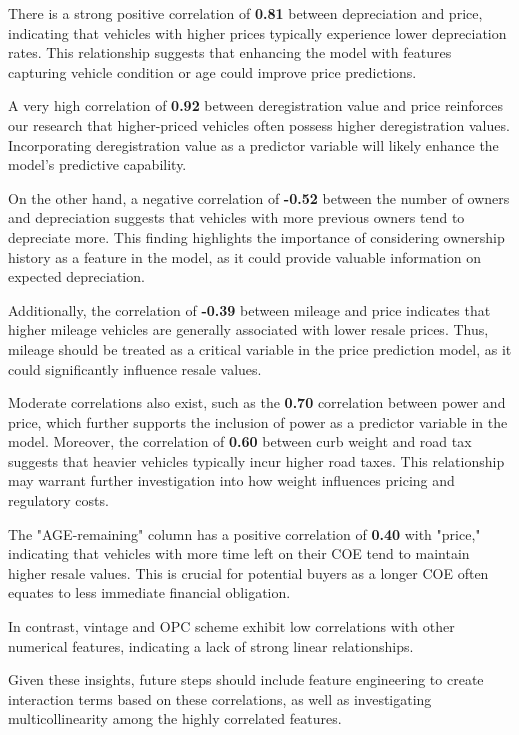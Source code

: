 \documentclass[conference]{IEEEtran}
\begin{document}
There is a strong positive correlation of \textbf{0.81} between depreciation and price, indicating that vehicles with higher prices typically experience lower depreciation rates. This relationship suggests that enhancing the model with features capturing vehicle condition or age could improve price predictions.

A very high correlation of \textbf{0.92} between deregistration value and price reinforces our research that higher-priced vehicles often possess higher deregistration values. Incorporating deregistration value as a predictor variable will likely enhance the model's predictive capability.

On the other hand, a negative correlation of \textbf{-0.52} between the number of owners and depreciation suggests that vehicles with more previous owners tend to depreciate more. This finding highlights the importance of considering ownership history as a feature in the model, as it could provide valuable information on expected depreciation.

Additionally, the correlation of \textbf{-0.39} between mileage and price indicates that higher mileage vehicles are generally associated with lower resale prices. Thus, mileage should be treated as a critical variable in the price prediction model, as it could significantly influence resale values.

Moderate correlations also exist, such as the \textbf{0.70} correlation between power and price, which further supports the inclusion of power as a predictor variable in the model. Moreover, the correlation of \textbf{0.60} between curb weight and road tax suggests that heavier vehicles typically incur higher road taxes. This relationship may warrant further investigation into how weight influences pricing and regulatory costs.

The "AGE-remaining" column has a positive correlation of \textbf{0.40} with "price," indicating that vehicles with more time left on their COE tend to maintain higher resale values. This is crucial for potential buyers as a longer COE often equates to less immediate financial obligation.

In contrast, vintage and OPC scheme exhibit low correlations with other numerical features, indicating a lack of strong linear relationships.

Given these insights, future steps should include feature engineering to create interaction terms based on these correlations, as well as investigating multicollinearity among the highly correlated features. 
\end{document}
